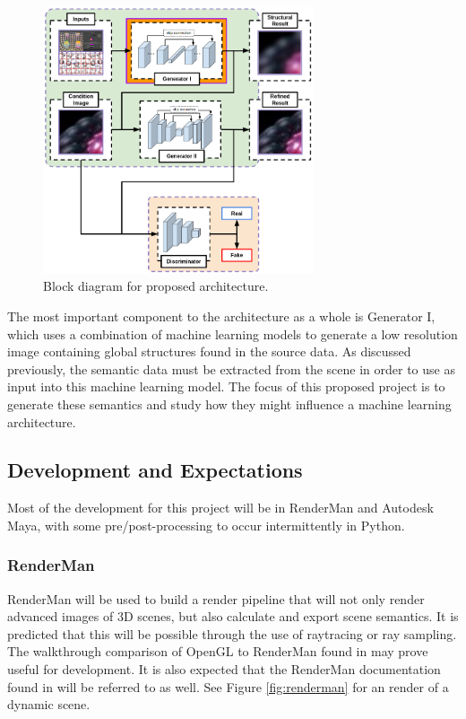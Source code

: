 \documentclass[conference]{IEEEtran}
\begin{document}
\begin{figure}[htbp]
\centerline{\includegraphics[width=8cm]{block_diagram.png}}
\caption{Block diagram for proposed architecture.}
\label{fig:block_diagram}
\end{figure}

The most important component to the architecture as a whole
is Generator I, which uses a combination of machine learning models to generate a
low resolution image containing global structures found in the
source data. As discussed previously, the semantic data must be extracted from
the scene in order to use as input into this machine learning model.
The focus of this proposed project is to generate these semantics and study
how they might influence a machine learning architecture.

\subsection{Development and Expectations}
Most of the development for this project will be in RenderMan and Autodesk Maya,
with some pre/post-processing to occur intermittently in Python.

\subsubsection{RenderMan}
RenderMan will be used to build a render pipeline that will not only render advanced images
of 3D scenes, but also calculate and export scene semantics.
It is predicted that this will be possible through the use of raytracing or ray sampling.
The walkthrough comparison of OpenGL to RenderMan found in \cite{renderman_opengl}
may prove useful for development.
It is also expected that the RenderMan documentation found in \cite{renderman_docs}
will be referred to as well.
See Figure \ref{fig:renderman} for an render of a dynamic scene.
\end{document}
